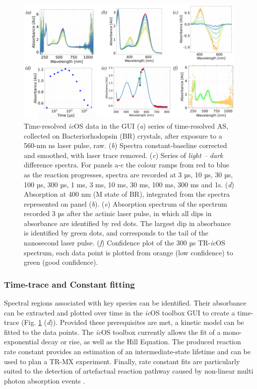 \begin{figure}[H] %
    \centering
    \noindent \includegraphics[width=\textwidth]{images/Spectroscopy/icOS_toolbox_Fig.4.pdf}
    \hfill
    \caption{Time-resolved \textit{ic}OS data in the GUI (\textit{a}) series of time-resolved AS, collected on Bacteriorhodopsin (BR) crystals, after exposure to a  560-nm ns laser pulse, raw. (\textit{b}) Spectra constant-baseline corrected and smoothed, with laser trace removed.  (\textit{c}) Series of \textit{light – dark} difference spectra. For panels a-c the colour ramps from red to blue as the reaction progresses, spectra are recorded at 3 µs, 10 µs, 30 µs, 100 µs, 300 µs, 1 ms, 3 ms, 10 ms, 30 ms, 100 ms, 300 ms and 1s. (\textit{d}) Absorption at 400 nm (M state of BR), integrated from the spectra represented on panel (\textit{b}). (\textit{e}) Absorption spectrum of the spectrum recorded 3 µs after the actinic laser pulse, in which all dips in absorbance are identified by red dots. The largest dip in absorbance is identified by green dots, and corresponds to the tail of the nanosecond laser pulse. (\textit{f}) Confidence plot of the 300 µs TR-\textit{ic}OS spectrum, each data point is plotted from orange (low confidence) to green (good confidence).}
    \label{fig:toolbox_TRicOS}
\end{figure}


\subsubsection{Time-trace and Constant fitting}
Spectral regions associated with key species can be identified. Their absorbance can be extracted and plotted over time in the \textit{ic}OS toolbox GUI to create a time-trace (Fig. \ref{fig:toolbox_TRicOS} (\textit{d})). 
Provided these prerequisites are met, a kinetic model can be fitted to the data points. The \textit{ic}OS toolbox currently allows the fit of a mono-exponential decay or rise, as well as the Hill Equation. The produced reaction rate constant provides an estimation of an intermediate-state lifetime and can be used to plan a TR-MX experiment. Finally, rate constant fits are particularly suited to the detection of artefactual reaction pathway caused by non-linear multi photon absorption events 
\parencite{doTwophotonAbsorptionPhotoionization2023,engilbergeTRicOSSetupESRF2024,barendsInfluencePumpLaser2024,bertrandStructuralEffectsHigh2024}. 

